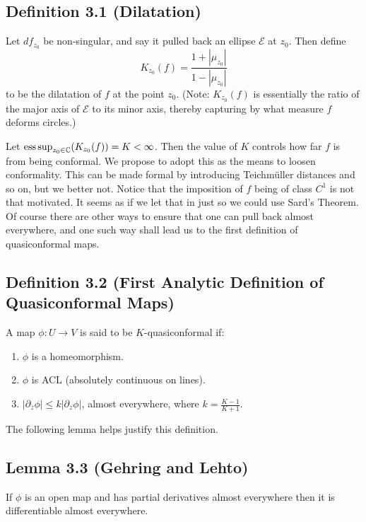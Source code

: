 \documentclass[11pt,a4paper]{article}
\begin{document}
        \subsection*{Definition 3.1 (Dilatation)} Let $df_{z_0}$ be non-singular, and say it pulled back an ellipse $\mathcal{E}$ at $z_0$. Then define $$K_{z_0}(f) =  \frac{1+|\mu_{z_0}|}{1- |\mu_{z_0}|}$$
        to be the dilatation of $f$ at the point $z_0$. (Note: $K_{z_0}(f)$ is essentially the ratio of the major axis of $\mathcal{E}$ to its minor axis, thereby capturing by what measure $f$ deforms circles.)



        Let $\operatorname*{ess\,sup}_{z_0 \in \mathbb{C}}(K_{z_0}(f)) = K < \infty$. Then the value of $K$ controls how far $f$ is from being conformal. We propose to adopt this as the means to loosen conformality. This can be made formal by introducing Teichm\"uller distances and so on, but we better not. Notice that the imposition of $f$ being of class $C^1$ is not that motivated. It seems as if we let that in just so we could use Sard's Theorem. Of course there are other ways to ensure that one can pull back almost everywhere, and one such way shall lead us to the first definition of quasiconformal maps.

        \subsection*{Definition 3.2 (First Analytic Definition of Quasiconformal Maps)} A map $\phi: U \rightarrow V$ is said to be $K$-quasiconformal if:
        \begin{enumerate}
            \item $\phi$ is a homeomorphism.
            \item $\phi$ is ACL (absolutely continuous on lines).
            \item $|\partial_{\overline{z}}\phi| \leq k|\partial_{z}\phi| $, almost everywhere, where $k = \frac{K-1}{K+1}$.
        \end{enumerate}



        The following lemma helps justify this definition.

        \subsection*{Lemma 3.3 (Gehring and Lehto)} If $\phi$ is an open map and has partial derivatives almost everywhere then it is differentiable almost everywhere.
\end{document}
